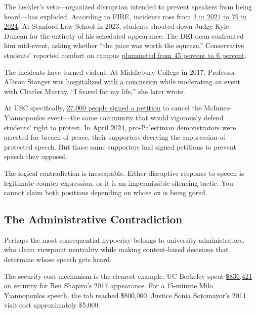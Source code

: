 \documentclass[11pt]{article}
\begin{document}
The heckler's veto---organized disruption intended to prevent speakers from being heard---has exploded. According to FIRE, incidents rose from \href{https://www.thefire.org/news/worst-both-worlds-campus-free-speech}{3 in 2021 to 79 in 2024}. At Stanford Law School in 2023, students shouted down Judge Kyle Duncan for the entirety of his scheduled appearance. The DEI dean confronted him mid-event, asking whether ``the juice was worth the squeeze.'' Conservative students' reported comfort on campus \href{https://www.thefire.org/news/stanford-students-comfort-expressing-ideas-dropped-6-following-judge-duncan-event}{plummeted from 45 percent to 6 percent}.

The incidents have turned violent. At Middlebury College in 2017, Professor Allison Stanger was \href{https://www.nytimes.com/2017/03/13/opinion/understanding-the-angry-mob-that-gave-me-a-concussion.html}{hospitalized with a concussion} while moderating an event with Charles Murray. ``I feared for my life,'' she later wrote.

At USC specifically, \href{https://www.postandcourier.com/education-lab/usc-doj-charlie-kirk-outdoor-event-controversial/article_c1d6ca0b-1173-403d-bd16-6f8fec66f748.html}{27,000 people signed a petition} to cancel the McInnes-Yiannopoulos event---the same community that would vigorously defend students' right to protest. In April 2024, pro-Palestinian demonstrators were arrested for breach of peace, their supporters decrying the suppression of protected speech. But those same supporters had signed petitions to prevent speech they opposed.

The logical contradiction is inescapable. Either disruptive response to speech is legitimate counter-expression, or it is an impermissible silencing tactic. You cannot claim both positions depending on whose ox is being gored.

\subsection{The Administrative Contradiction}

Perhaps the most consequential hypocrisy belongs to university administrators, who claim viewpoint neutrality while making content-based decisions that determine whose speech gets heard.

The security cost mechanism is the clearest example. UC Berkeley spent \href{https://www.berkeleyside.org/2018/02/06/uc-berkeley-spent-close-4m-security-just-one-month-2017}{\$836,421 on security} for Ben Shapiro's 2017 appearance. For a 15-minute Milo Yiannopoulos speech, the tab reached \$800,000. Justice Sonia Sotomayor's 2011 visit cost approximately \$5,000.
\end{document}
